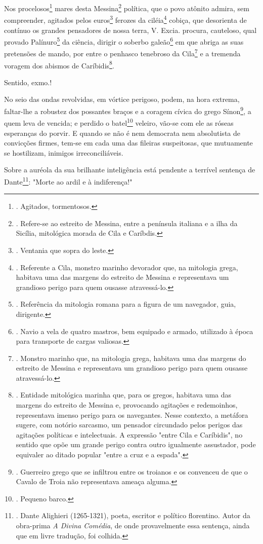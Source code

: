 Nos procelosos\footnote{. Agitados, tormentosos.} mares desta
Messina\footnote{. Refere-se ao estreito de Messina, entre a península
  italiana e a ilha da Sicília, mitológica morada de Cila e Caríbdis.}
política, que o povo atônito admira, sem compreender, agitados pelos
euros\footnote{. Ventania que sopra do leste.} ferozes da
ciléia\footnote{. Referente a Cila, monstro marinho devorador que, na
  mitologia grega, habitava uma das margens do estreito de Messina e
  representava um grandioso perigo para quem ousasse atravessá-lo.}
cobiça, que desorienta de contínuo os grandes pensadores de nossa terra,
V. Excia. procura, cauteloso, qual provado Palínuro\footnote{.
  Referência da mitologia romana para a figura de um navegador, guia,
  dirigente.} da ciência, dirigir o soberbo galeão\footnote{. Navio a
  vela de quatro mastros, bem equipado e armado, utilizado à época para
  transporte de cargas valiosas.} em que abriga as suas pretensões de
mando, por entre o penhasco tenebroso da Cila\footnote{. Monstro marinho
  que, na mitologia grega, habitava uma das margens do estreito de
  Messina e representava um grandioso perigo para quem ousasse
  atravessá-lo.} e a tremenda voragem dos abismos de
Caríbidis\footnote{. Entidade mitológica marinha que, para os gregos,
  habitava uma das margens do estreito de Messina e, provocando
  agitações e redemoinhos, representava imenso perigo para os
  navegantes. Nesse contexto, a metáfora sugere, com notório sarcasmo,
  um pensador circundado pelos perigos das agitações políticas e
  intelectuais. A expressão "entre Cila e Caríbidis", no sentido que
  opõe um grande perigo contra outro igualmente assustador, pode
  equivaler ao ditado popular "entre a cruz e a espada".}.

Sentido, exmo.!

No seio das ondas revolvidas, em vórtice perigoso, podem, na hora
extrema, faltar-lhe a robustez dos possantes braços e a coragem cívica
do grego Sínon\footnote{. Guerreiro grego que se infiltrou entre os
  troianos e os convenceu de que o Cavalo de Troia não representava
  ameaça alguma.}, a quem leva de vencida; e perdido o batel\footnote{.
  Pequeno barco.} veleiro, vão-se com ele as róseas esperanças do
porvir. E quando se não é nem democrata nem absolutista de convicções
firmes, tem-se em cada uma das fileiras suspeitosas, que mutuamente se
hostilizam, inimigos irreconciliáveis.

Sobre a auréola da sua brilhante inteligência está pendente a terrível
sentença de Dante\footnote{. Dante Alighieri (1265-1321), poeta,
  escritor e político florentino. Autor da obra-prima \emph{A Divina
  Comédia}, de onde provavelmente essa sentença, ainda que em livre
  tradução, foi colhida.}: "Morte ao ardil e à indiferença!"


